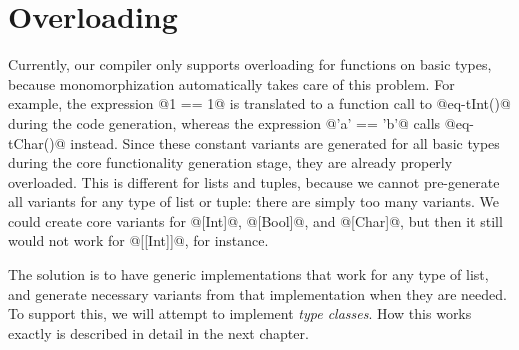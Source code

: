 \section{Overloading}
Currently, our compiler only supports overloading for functions on basic types, because monomorphization automatically takes care of this problem. For example, the expression @1 == 1@ is translated to a function call to @eq-tInt()@ during the code generation, whereas the expression @'a' == 'b'@ calls @eq-tChar()@ instead. Since these constant variants are generated for all basic types during the core functionality generation stage, they are already properly overloaded. This is different for lists and tuples, because we cannot pre-generate all variants for any type of list or tuple: there are simply too many variants. We could create core variants for @[Int]@, @[Bool]@, and @[Char]@, but then it still would not work for @[[Int]]@, for instance.

The solution is to have generic implementations that work for any type of list, and generate necessary variants from that implementation when they are needed. To support this, we will attempt to implement \textit{type classes}. How this works exactly is described in detail in the next chapter.
